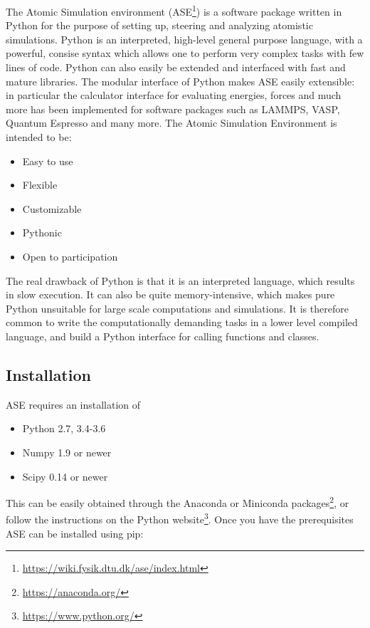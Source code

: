 The Atomic Simulation environment (ASE\footnote{
\url{https://wiki.fysik.dtu.dk/ase/index.html}})
\parencite[Larsen et al.]{larsen2017atomic}
is a software package written in Python for the purpose
of setting up, steering and analyzing atomistic simulations.
Python is an interpreted, high-level general purpose language,
with a powerful, consise syntax which allows one to perform
very complex tasks with few lines of code. Python can also
easily be extended and interfaced with fast and mature
libraries. The modular interface of Python makes ASE
easily extensible: in particular the calculator interface
for evaluating energies, forces and much more has been
implemented for software packages such as LAMMPS, VASP,
Quantum Espresso and many more.
The Atomic Simulation Environment is intended to be:

\begin{itemize}
    \item Easy to use
    \item Flexible
    \item Customizable
    \item Pythonic
    \item Open to participation
\end{itemize}

The real drawback of Python is that it is an interpreted language,
which results in slow execution. It can also be quite memory-intensive,
which makes pure Python unsuitable for large scale computations
and simulations. It is therefore common to write the
computationally demanding tasks in a lower level compiled language,
and build a Python interface for calling functions and classes.

\subsection{Installation}
ASE requires an installation of

\begin{itemize}
    \item Python 2.7, 3.4-3.6
    \item Numpy 1.9 or newer
    \item Scipy 0.14 or newer
\end{itemize}

This can be easily obtained through the Anaconda 
or Miniconda packages\footnote{\url{https://anaconda.org/}},
or follow the instructions on the Python website\footnote{
\url{https://www.python.org/}}.
Once you have the prerequisites ASE can be installed using pip:

